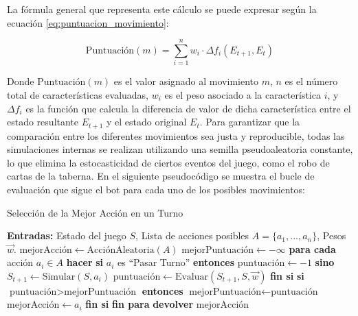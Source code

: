 La fórmula general que representa este cálculo se puede expresar según la ecuación \ref{eq:puntuacion_movimiento}:

\begin{equation}
\text{Puntuación}(m) = \sum_{i=1}^{n} w_i \cdot \Delta f_i(E_{t+1}, E_t) \label{eq:puntuacion_movimiento}
\end{equation}

Donde $\text{Puntuación}(m)$ es el valor asignado al movimiento $m$, $n$ es el número total de características evaluadas, $w_i$ es el peso asociado a la característica $i$, y $\Delta f_i$ es la función que calcula la diferencia de valor de dicha característica entre el estado resultante $E_{t+1}$ y el estado original $E_t$. Para garantizar que la comparación entre los diferentes movimientos sea justa y reproducible, todas las simulaciones internas se realizan utilizando una semilla pseudoaleatoria constante, lo que elimina la estocasticidad de ciertos eventos del juego, como el robo de cartas de la taberna. En el siguiente pseudocódigo se muestra el bucle de evaluación que sigue el bot para cada uno de los posibles movimientos:

\begin{algorithm}[H]
    \caption{Selección de la Mejor Acción en un Turno}
    \label{alg:get_best_move}
    \begin{algorithmic}[1]
        \State {}
        \State \textbf{Entradas:} Estado del juego $S$, Lista de acciones posibles $A = \{a_1, ..., a_n\}$, Pesos $\vec{w}$.
        \State
        \State $\text{mejorAcción} \leftarrow \text{AcciónAleatoria}(A)$
        \State $\text{mejorPuntuación} \leftarrow -\infty$
        \State
        \State \textbf{para cada} acción $a_i \in A$ \textbf{hacer}
        \State \quad \textbf{si} $a_i$ es ``Pasar Turno'' \textbf{entonces}
        \State \qquad $\text{puntuación} \leftarrow -1$
        \State \quad \textbf{sino}
        \State \qquad $S_{t+1} \leftarrow \text{Simular}(S, a_i)$
        \State \qquad $\text{puntuación} \leftarrow \text{Evaluar}(S_{t+1}, S, \vec{w})$ 
        \State \quad \textbf{fin si}
        \State
        \State \quad \textbf{si} $\text{puntuación} > \text{mejorPuntuación}$ \textbf{entonces}
        \State \qquad $\text{mejorPuntuación} \leftarrow \text{puntuación}$
        \State \qquad $\text{mejorAcción} \leftarrow a_i$
        \State \quad \textbf{fin si}
        \State \textbf{fin para}
        \State
        \State \textbf{devolver} $\text{mejorAcción}$
    \end{algorithmic}
\end{algorithm}


